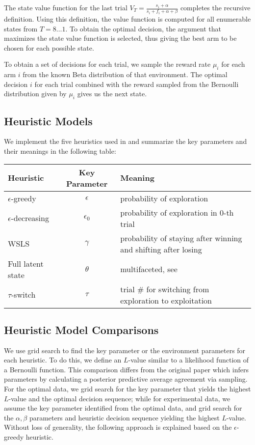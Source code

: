The state value function for the last trial $V_T=\frac{s_i + \alpha}{s_i + f_i + \alpha + \beta}$ completes the recursive definition. Using this definition, the value function is computed for all enumerable states from $T=8\ldots1$. To obtain the optimal decision, the argument that maximizes the state value function is selected, thus giving the best arm to be chosen for each possible state. 

To obtain a set of decisions for each trial, we sample the reward rate $\mu_i$ for each arm $i$ from the known Beta distribution of that environment. The optimal decision $i$ for each trial combined with the reward sampled from the Bernoulli distribution given by $\mu_i$ gives us the next state.

\subsection{Heuristic Models}
We implement the five heuristics used in \cite{shunan2011} and summarize the key parameters and their meanings in the following table: 

\begin{table}[h]
\begin{tabular}{|l|c|l|}
\hline
\textbf{Heuristic} & \textbf{Key Parameter} & \textbf{Meaning} \\ \hline
$\epsilon$-greedy & $\epsilon$ & probability of exploration \\ \hline
$\epsilon$-decreasing & $\epsilon_0$ & probability of exploration in 0-th trial \\ \hline
WSLS & $\gamma$ & probability of staying after winning and shifting after losing \\ \hline
Full latent state & $\theta$ & multifaceted, see \cite{shunan2009} \\ \hline
$\tau$-switch & $\tau$ & trial \# for switching from exploration to exploitation \\ \hline
\end{tabular}
\end{table}

\subsection{Heuristic Model Comparisons}
We use grid search to find the key parameter or the environment parameters for each heuristic. To do this, we define an $L$-value similar to a likelihood function of a Bernoulli function. This comparison differs from the original paper which infers parameters by calculating a posterior predictive average agreement via sampling. For the optimal data, we grid search for the key parameter that yields the highest $L$-value and the optimal decision sequence; while for experimental data, we assume the key parameter identified from the optimal data, and grid search for the $\alpha,\beta$ parameters and heuristic decision sequence yielding the highest $L$-value. Without loss of generality, the following approach is explained based on the $\epsilon$-greedy heuristic. 

